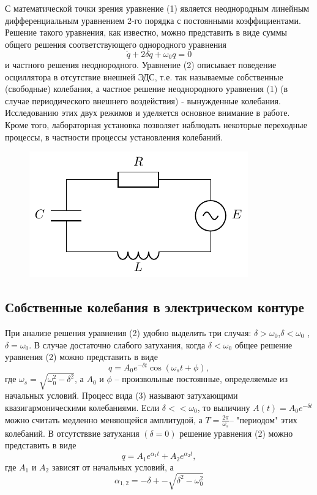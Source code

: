 С математической точки зрения уравнение (1) является неоднородным линейным дифференциальным уравнением 2-го порядка с постоянными коэффициентами. Решение такого уравнения, как известно, можно представить в виде суммы общего решения соответствующего однородного уравнения
\begin{equation}
	\ddot{q}+2\delta \dot{q}+\omega_0 q=0
\end{equation}
и частного решения неоднородного. Уравнение (2) описывает поведение осциллятора в отсутствие внешней ЭДС, т.е. так называемые собственные (свободные) колебания, а частное решение неоднородного уравнения (1) (в случае периодического внешнего воздействия) - вынужденные колебания. Исследованию этих двух режимов и уделяется основное внимание в работе. Кроме того, лабораторная установка позволяет наблюдать некоторые переходные процессы, в частности процессы установления колебаний.
\begin{figure}[h!]
	\centering
    \includegraphics[]{chem/rcle}
    \caption{}
    \label{chem:rcle}
\end{figure}

\subsection{Собственные колебания в электрическом контуре}
При анализе решения уравнения (2) удобно выделить три случая: $\delta > \omega_0$,$\delta < \omega_0$ ,$\delta = \omega_0$.
В случае достаточно слабого затухания, когда $\delta < \omega_0$ общее решение уравнения (2) можно представить в виде
\begin{equation}
	q=A_0 e^{-\delta t}\cos(\omega_s t+\phi),
\end{equation}
где $\omega_s=\sqrt{\omega_0^2-\delta^2}$, а $A_0$ и $\phi$ -- произвольные постоянные, определяемые из начальных условий.
Процесс вида (3) называют затухающими квазигармоническими колебаниями. Если $\delta<<\omega_0$, то выличину $A(t)=A_0e^{-\delta t}$ можно считать медленно меняющейся амплитудой, а 
$T=\frac{2\pi}{\omega_s}$-- "периодом" этих колебаний.
В отсутстввие затухания $(\delta=0)$ решение уравнения (2) можно представить в виде
\begin{equation}
	q=A_1e^{\alpha_1 t}+A_2e^{\alpha_2 t},
\end{equation}
где $A_1$ и $A_2$ зависят от начальных условий, а 
\begin{equation}
	\alpha_{1,2}=-\delta+-\sqrt{\delta^2-\omega_0^2}
\end{equation}


